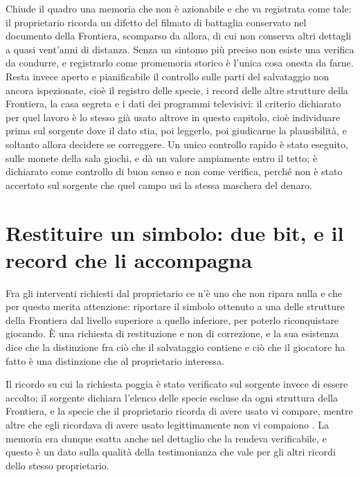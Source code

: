 Chiude il quadro una memoria che non è azionabile e che va registrata come tale: il proprietario ricorda un difetto del filmato di battaglia conservato nel documento della Frontiera, scomparso da allora, di cui non conserva altri dettagli a quasi vent'anni di distanza. Senza un sintomo più preciso non esiste una verifica da condurre, e registrarlo come promemoria storico è l'unica cosa onesta da farne. Resta invece aperto e pianificabile il controllo sulle parti del salvataggio non ancora ispezionate, cioè il registro delle specie, i record delle altre strutture della Frontiera, la casa segreta e i dati dei programmi televisivi: il criterio dichiarato per quel lavoro è lo stesso già usato altrove in questo capitolo, cioè individuare prima sul sorgente dove il dato stia, poi leggerlo, poi giudicarne la plausibilità, e soltanto allora decidere se correggere. Un unico controllo rapido è stato eseguito, sulle monete della sala giochi, e dà un valore ampiamente entro il tetto; è dichiarato come controllo di buon senso e non come verifica, perché non è stato accertato sul sorgente che quel campo usi la stessa maschera del denaro.

\section{Restituire un simbolo: due bit, e il record che li accompagna}

Fra gli interventi richiesti dal proprietario ce n'è uno che non ripara nulla e che per questo merita attenzione: riportare il simbolo ottenuto a una delle strutture della Frontiera dal livello superiore a quello inferiore, per poterlo riconquistare giocando. È una richiesta di restituzione e non di correzione, e la sua esistenza dice che la distinzione fra ciò che il salvataggio contiene e ciò che il giocatore ha fatto è una distinzione che al proprietario interessa.

Il ricordo su cui la richiesta poggia è stato verificato sul sorgente invece di essere accolto: il sorgente dichiara l'elenco delle specie escluse da ogni struttura della Frontiera, e la specie che il proprietario ricorda di avere usato vi compare, mentre altre che egli ricordava di avere usato legittimamente non vi compaiono \cite{pokeemerald}. La memoria era dunque esatta anche nel dettaglio che la rendeva verificabile, e questo è un dato sulla qualità della testimonianza che vale per gli altri ricordi dello stesso proprietario.

